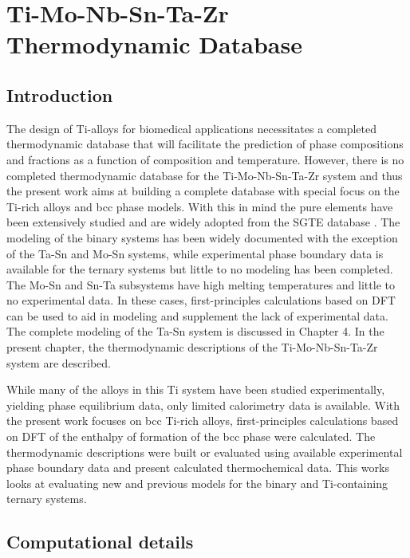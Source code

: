 \chapter{Ti-Mo-Nb-Sn-Ta-Zr \\Thermodynamic Database}

\section{Introduction}

The design of Ti-alloys for biomedical applications necessitates a completed thermodynamic database that will facilitate the prediction of phase compositions and fractions as a function of composition and temperature. However, there is no completed thermodynamic database for the Ti-Mo-Nb-Sn-Ta-Zr system and thus the present work aims at building a complete database with special focus on the Ti-rich alloys and bcc phase models. With this in mind the pure elements have been extensively studied and are widely adopted from the SGTE database \cite{Dinsdale1991}. The modeling of the binary systems has been widely documented with the exception of the Ta-Sn and Mo-Sn systems, while experimental phase boundary data is available for the ternary systems but little to no modeling has been completed. The Mo-Sn and Sn-Ta subsystems have high melting temperatures and little to no experimental data. In these cases, first-principles calculations based on DFT can be used to aid in modeling and supplement the lack of experimental data. The complete modeling of the Ta-Sn system is discussed in Chapter 4. In the present chapter, the thermodynamic descriptions of the Ti-Mo-Nb-Sn-Ta-Zr system are described. 

While many of the alloys in this Ti system have been studied experimentally, yielding phase equilibrium data, only limited calorimetry data is available. With the present work focuses on bcc Ti-rich alloys, first-principles calculations based on DFT of the enthalpy of formation of the bcc phase were calculated. The thermodynamic descriptions were built or evaluated using available experimental phase boundary data and present calculated thermochemical data. This works looks at evaluating new and previous models for the binary and Ti-containing ternary systems. 

\section{Computational details}

